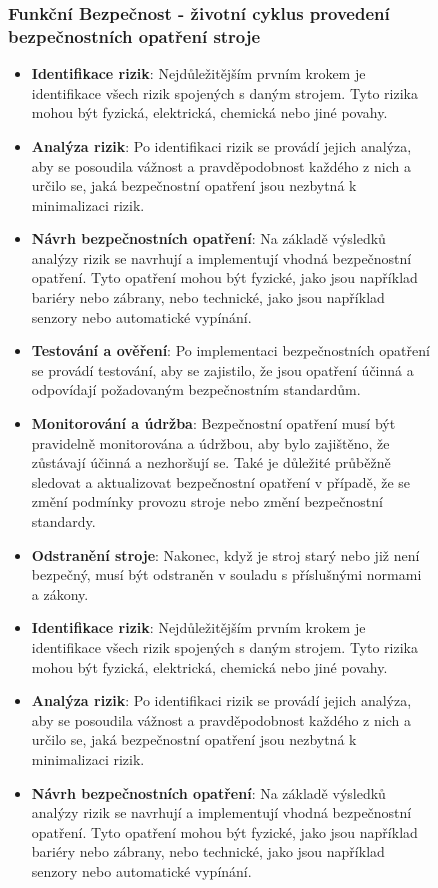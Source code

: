 \begin{figure}[h]
\subsubsection*{Funkční Bezpečnost - životní cyklus provedení bezpečnostních opatření stroje}
\begin{itemize}
  \item \textbf{Identifikace rizik}: Nejdůležitějším prvním krokem je identifikace všech rizik spojených s daným strojem. Tyto rizika mohou být fyzická, elektrická, chemická nebo jiné povahy.
  \item \textbf{Analýza rizik}: Po identifikaci rizik se provádí jejich analýza, aby se posoudila vážnost a pravděpodobnost každého z nich a určilo se, jaká bezpečnostní opatření jsou nezbytná k minimalizaci rizik.
  \item \textbf{Návrh bezpečnostních opatření}: Na základě výsledků analýzy rizik se navrhují a implementují vhodná bezpečnostní opatření. Tyto opatření mohou být fyzické, jako jsou například bariéry nebo zábrany, nebo technické, jako jsou například senzory nebo automatické vypínání.
  \item \textbf{Testování a ověření}: Po implementaci bezpečnostních opatření se provádí testování, aby se zajistilo, že jsou opatření účinná a odpovídají požadovaným bezpečnostním standardům.
  \item \textbf{Monitorování a údržba}: Bezpečnostní opatření musí být pravidelně monitorována a údržbou, aby bylo zajištěno, že zůstávají účinná a nezhoršují se. Také je důležité průběžně sledovat a aktualizovat bezpečnostní opatření v případě, že se změní podmínky provozu stroje nebo změní bezpečnostní standardy.
  \item \textbf{Odstranění stroje}: Nakonec, když je stroj starý nebo již není bezpečný, musí být odstraněn v souladu s příslušnými normami a zákony.
    \item \textbf{Identifikace rizik}: Nejdůležitějším prvním krokem je identifikace všech rizik spojených s daným strojem. Tyto rizika mohou být fyzická, elektrická, chemická nebo jiné povahy.
    \item \textbf{Analýza rizik}: Po identifikaci rizik se provádí jejich analýza, aby se posoudila vážnost a pravděpodobnost každého z nich a určilo se, jaká bezpečnostní opatření jsou nezbytná k minimalizaci rizik.
    \item \textbf{Návrh bezpečnostních opatření}: Na základě výsledků analýzy rizik se navrhují a implementují vhodná bezpečnostní opatření. Tyto opatření mohou být fyzické, jako jsou například bariéry nebo zábrany, nebo technické, jako jsou například senzory nebo automatické vypínání.

\end{itemize}
\end{figure}
